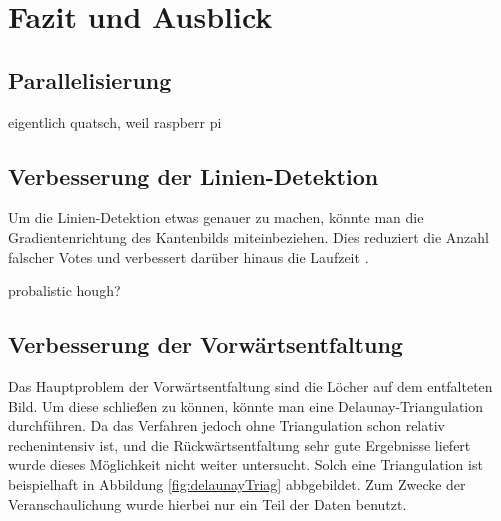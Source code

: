 \chapter{Fazit und Ausblick}
\label{ch:summary}

\section{Parallelisierung}

eigentlich quatsch, weil raspberr pi

\section{Verbesserung der Linien-Detektion}
Um die Linien-Detektion etwas genauer zu machen, könnte man die Gradientenrichtung des Kantenbilds miteinbeziehen. Dies reduziert die Anzahl falscher Votes und verbessert darüber hinaus die Laufzeit \cite{Gorman1976}. 

probalistic hough?

\section{Verbesserung der Vorwärtsentfaltung}
Das Hauptproblem der Vorwärtsentfaltung sind die Löcher auf dem entfalteten Bild. Um diese schließen zu können, könnte man eine Delaunay-Triangulation durchführen. 
Da das Verfahren jedoch ohne Triangulation schon relativ rechenintensiv ist, und die Rückwärtsentfaltung sehr gute Ergebnisse liefert wurde dieses Möglichkeit nicht weiter untersucht.
Solch eine Triangulation ist beispielhaft in Abbildung \ref{fig:delaunayTriag} abbgebildet. Zum Zwecke der Veranschaulichung wurde hierbei nur ein Teil der Daten benutzt.

